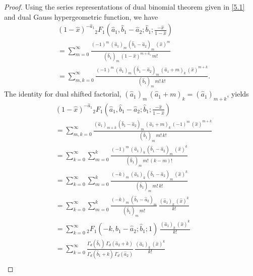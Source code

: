 \documentclass[10pt,a4paper]{amsart}
\begin{document}
\begin{proof}
	Using the series representations of dual binomial theorem given in \eqref{5.1} and dual Gauss hypergeometric function, we have
\begin{align}
&	(1 - \widehat{x})^{-\widehat{a}_1} {}_2F_1 \left(\widehat{a}_1, \widehat{b}_1 - \widehat{a}_2; \widehat{b}_1; \frac{-\widehat{x}}{1 - \widehat{x}}\right)\nonumber\\
 & = \sum_{m = 0}^{\infty} \frac{(-1)^m \, (\widehat{a}_1)_m \, (\widehat{b}_1 - \widehat{a}_2)_m \, (\widehat{x})^m}{(\widehat{b}_1)_m \, (1 - \widehat{x})^{m + \widehat{a}_1} \, m !}\nonumber\\
	& = \sum_{m, k = 0}^{\infty} \frac{(-1)^m \, (\widehat{a}_1)_m \, (\widehat{b}_1 - \widehat{a}_2)_m \, (\widehat{a}_1 + m)_k \, (\widehat{x})^{m + k} }{(\widehat{b}_1)_m  \, m ! \, k !}.
\end{align}
The identity for dual shifted factorial, $(\widehat{a}_1)_m \, (\widehat{a}_1 + m)_k = (\widehat{a}_1)_{m + k}$, yields
\begin{align}
&	(1 - \widehat{x})^{-\widehat{a}_1} {}_2F_1 \left(\widehat{a}_1, \widehat{b}_1 - \widehat{a}_2; \widehat{b}_1; \frac{-\widehat{x}}{1 - \widehat{x}}\right)\nonumber\\
 & =  \sum_{m, k = 0}^{\infty} \frac{ (\widehat{a}_1)_{m + k} \, (\widehat{b}_1 - \widehat{a}_2)_m \, (\widehat{a}_1 + m)_k \, (-1)^m \, (\widehat{x})^{m + k} }{(\widehat{b}_1)_m  \, m ! \, k !}\nonumber\\
	& = \sum_{k = 0}^{\infty} \sum_{m = 0}^{k} \frac{(-1)^m \, (\widehat{a}_1)_k \, (\widehat{b}_1 - \widehat{a}_2)_m \, (\widehat{x})^k}{(\widehat{b}_1)_m \, m ! \, (k - m)!}\nonumber\\
	& = \sum_{k = 0}^{\infty} \sum_{m = 0}^{k} \frac{(-k)_m \, (\widehat{a}_1)_k \, (\widehat{b}_1 - \widehat{a}_2)_m \, (\widehat{x})^k}{(\widehat{b}_1)_m \, m ! \, k!}\nonumber\\
	& = \sum_{k = 0}^{\infty} \sum_{m = 0}^{k} \frac{(-k)_m \,  (\widehat{b}_1 - \widehat{a}_2)_m}{(\widehat{b}_1)_m \, m ! } \, \frac{(\widehat{a}_1)_k \, (\widehat{x})^k}{k!}\nonumber\\
	& = \sum_{k = 0}^{\infty} {}_2F_1 (-k, \widehat{b}_1 - \widehat{a}_2; \widehat{b}_1; 1) \, \frac{(\widehat{a}_1)_k \, (\widehat{x})^k}{k!}\nonumber\\
	& = \sum_{k = 0}^{\infty} \frac{\Gamma_d (\widehat{b}_1) \, \Gamma_d (\widehat{a}_2 + k)}{\Gamma_d (\widehat{b}_1 + k) \, \Gamma_d (\widehat{a}_2)} \, \frac{(\widehat{a}_1)_k \, (\widehat{x})^k}{k!}\nonumber\\

\end{align}
\end{proof}
\end{document}
